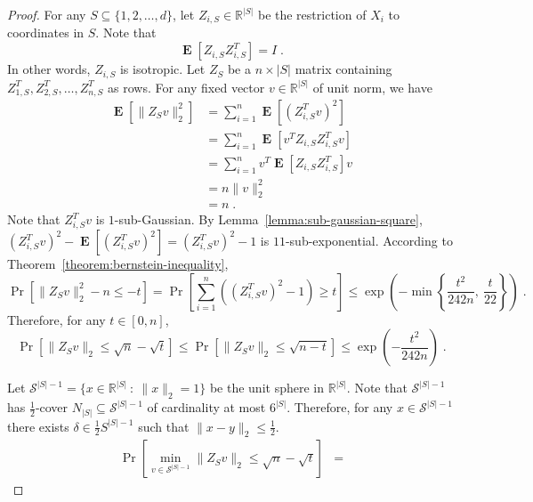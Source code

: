 \documentclass[12pt]{article}
\newcommand{\R}{\mathbb{R}}
\newcommand{\norm}[1]{\|{#1}\|}
\renewcommand{\S}{\mathcal{S}}
\DeclareMathOperator*{\Exp}{\mathbf{E}}
\begin{document}
\begin{proof}
For any $S \subseteq \{1,2,\dots,d\}$, let $Z_{i,S} \in \R^{|S|}$ be
the restriction of $X_i$ to coordinates in $S$. Note that
$$
\Exp[Z_{i,S} Z_{i,S}^T] = I \; .
$$
In other words, $Z_{i,S}$ is isotropic.
Let $Z_S$ be a $n \times |S|$ matrix containing $Z_{1,S}^T, Z_{2,S}^T, \dots, Z_{n,S}^T$ as rows.
For any fixed vector $v \in \R^{|S|}$ of unit norm, we have
\begin{align*}
\Exp\left[\norm{Z_S v}_2^2\right]
& = \sum_{i=1}^n \Exp\left[ \left(Z_{i,S}^T v \right)^2 \right] \\
& = \sum_{i=1}^n \Exp\left[ v^T Z_{i,S} Z_{i,S}^T v \right] \\
& = \sum_{i=1}^n v^T \Exp\left[ Z_{i,S} Z_{i,S}^T \right] v \\
& = n \norm{v}_2^2 \\
& = n \; .
\end{align*}
Note that $Z_{i,S}^T v$ is $1$-sub-Gaussian. By
Lemma~\ref{lemma:sub-gaussian-square}, $(Z_{i,S}^T v)^2 -
\Exp[(Z_{i,S}^T v)^2] = (Z_{i,S}^T v)^2 - 1$ is
$11$-sub-exponential. According to Theorem~\ref{theorem:bernstein-inequality},
$$
\Pr\left[ \norm{Z_S v}_2^2 - n \le - t \right]
= \Pr\left[ \sum_{i=1}^n \left(\left(Z_{i,S}^T v \right)^2 - 1\right) \ge t \right]
\le \exp\left( - \min \left\{ \frac{t^2}{242 n}, \ \frac{t}{22} \right\} \right) \; .
$$
Therefore, for any $t \in [0,n]$,
$$
\Pr\left[ \norm{Z_S v}_2 \le \sqrt{n} - \sqrt{t} \right]
\le \Pr\left[ \norm{Z_S v}_2 \le \sqrt{n - t} \right]
\le \exp\left( - \frac{t^2}{242 n} \right) \; .
$$

Let $\S^{|S|-1} = \{ x \in \R^{|S|} ~:~ \norm{x}_2 = 1 \}$ be the unit sphere in $\R^{|S|}$.
Note that $\S^{|S|-1}$ has $\frac{1}{2}$-cover $N_{|S|} \subseteq \S^{|S|-1}$ of cardinality
at most $6^{|S|}$. Therefore, for any $x \in \S^{|S|-1}$ there exists $\delta \in \frac{1}{2}S^{|S|-1}$
such that $\norm{x-y}_2 \le \frac{1}{2}$.
\begin{align*}
\Pr\left[ \min_{v \in \S^{|S|-1}} \norm{Z_S v}_2 \le \sqrt{n} - \sqrt{t} \right]
& =
\end{align*}
\end{proof}
\end{document}
